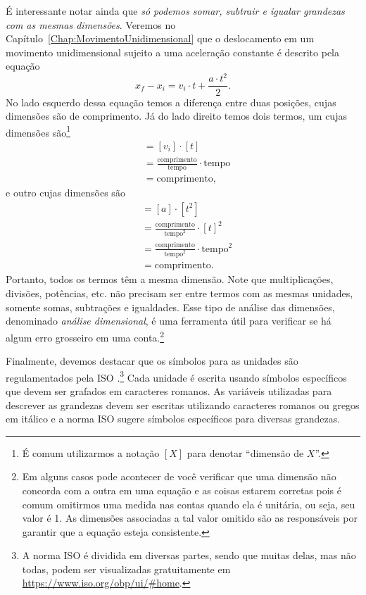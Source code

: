 É interessante notar ainda que \emph{só podemos somar, subtrair e igualar grandezas com as mesmas dimensões}. Veremos no Capítulo~\ref{Chap:MovimentoUnidimensional} que o deslocamento em um movimento unidimensional sujeito a uma aceleração constante é descrito pela equação
\begin{equation}
x_f - x_i = v_i \cdot t + \frac{a\cdot t^2}{2}.
\end{equation}
%
No lado esquerdo dessa equação temos a diferença entre duas posições, cujas dimensões são de comprimento. Já do lado direito temos dois termos, um cujas dimensões são\footnote{É comum utilizarmos a notação $[X]$ para denotar ``dimensão de $X$''.}
\begin{align}
    [v_i\cdot t] &= [v_i]\cdot[t] \\
    &=\frac{\text{comprimento}}{\text{tempo}} \cdot \text{tempo} \\
    &=\text{comprimento},
\end{align}
%
e outro cujas dimensões são
\begin{align}
    [a \cdot t^2] &= [a]\cdot[t^2] \\
    &= \frac{\text{comprimento}}{\text{tempo}^2} \cdot [t]^2 \\
    &= \frac{\text{comprimento}}{\text{tempo}^2} \cdot \text{tempo}^2 \\
    &= \text{comprimento}.
\end{align}
%
Portanto, todos os termos têm a mesma dimensão. Note que multiplicações, divisões, potências, etc. não precisam ser entre termos com as mesmas unidades, somente somas, subtrações e igualdades. Esse tipo de análise das dimensões, denominado \emph{análise dimensional}, é uma ferramenta útil para verificar se há algum erro grosseiro em uma conta.\footnote[][-3cm]{Em alguns casos pode acontecer de você verificar que uma dimensão não concorda com a outra em uma equação e as coisas estarem corretas pois é comum omitirmos uma medida nas contas quando ela é unitária, ou seja, seu valor é 1. As dimensões associadas a tal valor omitido são as responsáveis por garantir que a equação esteja consistente.}

Finalmente, devemos destacar que os símbolos para as unidades são regulamentados pela ISO .\footnote{A norma ISO  é dividida em diversas partes, sendo que muitas delas, mas não todas, podem ser visualizadas gratuitamente em \url{https://www.iso.org/obp/ui/\#home}.} Cada unidade é escrita usando símbolos específicos que devem ser grafados em caracteres romanos. As variáveis utilizadas para descrever as grandezas devem ser escritas utilizando caracteres romanos ou gregos em itálico e a norma ISO  sugere símbolos específicos para diversas grandezas. 

